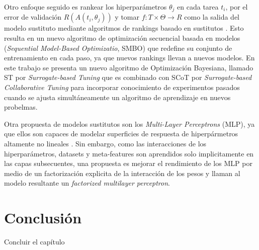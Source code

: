 Otro enfoque seguido es rankear los hiperparámetros $\theta_j$ en cada tarea $t_i$, por el error de validación $R(A(t_i, \theta_j))$ y tomar  $f: T \times \Theta \rightarrow R$ como la salida del modelo sustituto mediante algoritmos de rankings basado en sustitutos \cite{bardenet2013hyper, yogatama2014efficient}. Esto resulta en un nuevo algoritmo de optimización secuencial basada en modelos (\textit{Sequential Model-Based Optimizatio}, SMBO) que redefine su conjunto de entrenamiento en cada paso, ya que nuevos rankings llevan a nuevos modelos. En este trabajo se presenta un nuevo algoritmo de Optimización Bayesiana, llamado ST por \textit{Surrogate-based Tuning} que es combinado con SCoT por \textit{Surrogate-based Collaborative Tuning} para incorporar conocimiento de experimentos pasados cuando se ajusta simultáneamente un algoritmo de aprendizaje en nuevos probelmas.


Otra propuesta de modelos sustitutos son los \textit{Multi-Layer Perceptrons} (MLP), ya que ellos son capaces de modelar superficies de respuesta de hiperpármetros altamente no lineales \cite{schilling2015hyp}. Sin embargo, como las interacciones de los hiperparámetros, datasets y meta-features son aprendidos solo implicitamente en las capas subsecuentes, una propuesta es mejorar el rendimiento de los MLP por medio de un factorización explicita de la interacción de los pesos y llaman al modelo resultante un \textit{factorized multilayer perceptron}.




\section{Conclusión}\label{sec:conclusion}

Concluir el capítulo


